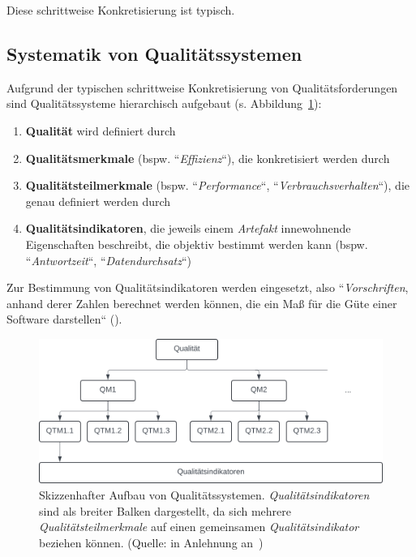 \noindent
Diese schrittweise Konkretisierung ist typisch.

\subsection*{Systematik von Qualitätssystemen}
Aufgrund der typischen schrittweise Konkretisierung von Qualitätsforderungen sind Qualitätssysteme hierarchisch aufgebaut (s. Abbildung~\ref{fig:qualitätssysteme}):

\begin{enumerate}
    \item \textbf{Qualität} wird definiert durch
    \item \textbf{Qualitätsmerkmale} (bspw. ``\textit{Effizienz}``), die konkretisiert werden durch
    \item \textbf{Qualitätsteilmerkmale} (bspw. ``\textit{Performance}``, ``\textit{Verbrauchsverhalten}``), die genau definiert werden durch
    \item \textbf{Qualitätsindikatoren}, die jeweils einem \textit{Artefakt} innewohnende Eigenschaften beschreibt, die objektiv bestimmt werden kann (bspw. ``\textit{Antwortzeit}``, ``\textit{Datendurchsatz}``)
\end{enumerate}

\noindent
Zur Bestimmung von Qualitätsindikatoren werden  eingesetzt, also ``\textit{Vorschriften}, anhand derer Zahlen berechnet werden können, die ein Maß für die Güte einer Software darstellen`` (\cite[3]{Wed09c}).


\begin{figure}
    \centering
    \includegraphics[scale=0.4]{part four/Qualität/img/qualitätssysteme}
    \caption{Skizzenhafter Aufbau von Qualitätssystemen. \textit{Qualitätsindikatoren} sind als breiter Balken dargestellt, da sich mehrere \textit{Qualitätsteilmerkmale} auf einen gemeinsamen \textit{Qualitätsindikator} beziehen können. (Quelle: in Anlehnung an~\cite[Abb. 1.1, 3]{Wed09c})}
    \label{fig:qualitätssysteme}
\end{figure}


